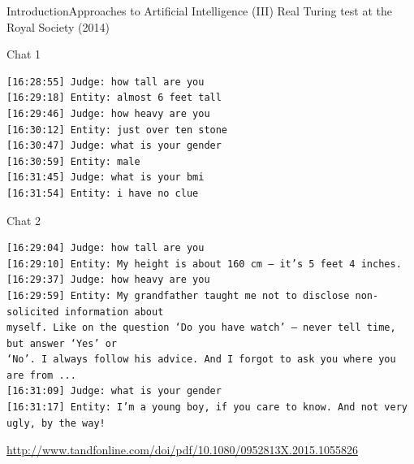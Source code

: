 \documentclass[10pt,compress]{beamer} %
\begin{document}
\begin{frame}[fragile]{Introduction}{Approaches to Artificial Intelligence (III)}
	Real Turing test at the Royal Society (2014)
	\tiny{
	   	\begin{exampleblock}{Chat 1} %
		\begin{verbatim}
[16:28:55] Judge: how tall are you
[16:29:18] Entity: almost 6 feet tall
[16:29:46] Judge: how heavy are you
[16:30:12] Entity: just over ten stone
[16:30:47] Judge: what is your gender
[16:30:59] Entity: male
[16:31:45] Judge: what is your bmi
[16:31:54] Entity: i have no clue
		\end{verbatim}
		\end{exampleblock}
	   	\begin{exampleblock}{Chat 2} %
		\begin{verbatim}
[16:29:04] Judge: how tall are you
[16:29:10] Entity: My height is about 160 cm – it’s 5 feet 4 inches.
[16:29:37] Judge: how heavy are you
[16:29:59] Entity: My grandfather taught me not to disclose non-solicited information about
myself. Like on the question ‘Do you have watch’ – never tell time, but answer ‘Yes’ or
‘No’. I always follow his advice. And I forgot to ask you where you are from ...
[16:31:09] Judge: what is your gender
[16:31:17] Entity: I’m a young boy, if you care to know. And not very ugly, by the way!
		\end{verbatim}
		\end{exampleblock}
	}
	\href{(Source)}{http://www.tandfonline.com/doi/pdf/10.1080/0952813X.2015.1055826}
\end{frame}
\end{document}
